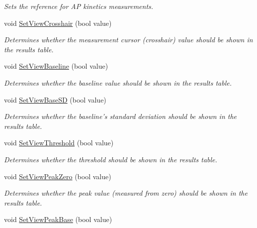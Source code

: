 \begin{DoxyCompactItemize}
\begin{DoxyCompactList}\small\item\em Sets the reference for AP kinetics measurements. \item\end{DoxyCompactList}\item 
void \hyperlink{classRecording_a82c26f36b16d1d03a460b471766c1e4c}{SetViewCrosshair} (bool value)
\begin{DoxyCompactList}\small\item\em Determines whether the measurement cursor (crosshair) value should be shown in the results table. \item\end{DoxyCompactList}\item 
void \hyperlink{classRecording_ab74ba2762701136721b91871c28ef1ad}{SetViewBaseline} (bool value)
\begin{DoxyCompactList}\small\item\em Determines whether the baseline value should be shown in the results table. \item\end{DoxyCompactList}\item 
void \hyperlink{classRecording_aa0a8612f254f12878d0c96445dcad524}{SetViewBaseSD} (bool value)
\begin{DoxyCompactList}\small\item\em Determines whether the baseline's standard deviation should be shown in the results table. \item\end{DoxyCompactList}\item 
void \hyperlink{classRecording_a21ce868a117047be3afca689815728d6}{SetViewThreshold} (bool value)
\begin{DoxyCompactList}\small\item\em Determines whether the threshold should be shown in the results table. \item\end{DoxyCompactList}\item 
void \hyperlink{classRecording_a7e55d7783064858180716359acdce742}{SetViewPeakZero} (bool value)
\begin{DoxyCompactList}\small\item\em Determines whether the peak value (measured from zero) should be shown in the results table. \item\end{DoxyCompactList}\item 
void \hyperlink{classRecording_a5fccaca2dc85e33dc3f82fec5f070d79}{SetViewPeakBase} (bool value)

\end{DoxyCompactItemize}
